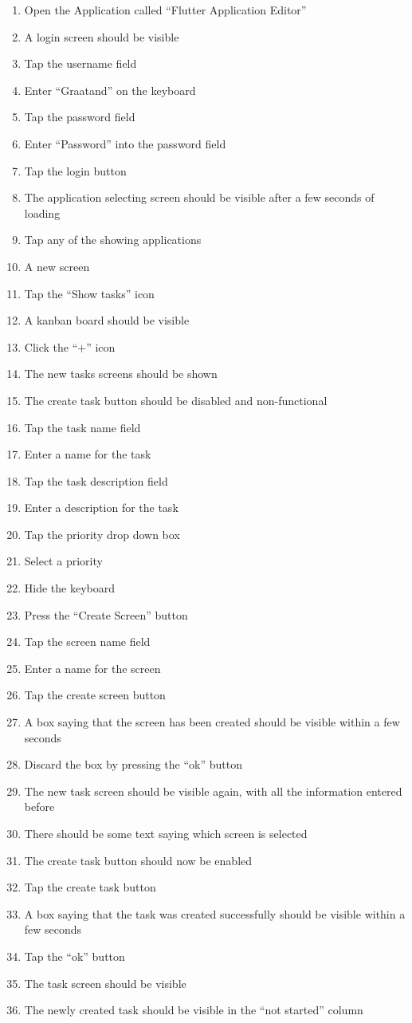 \begin{enumerate}
    \item Open the Application called “Flutter Application Editor”
    \item A login screen should be visible
    \item Tap the username field
    \item Enter “Graatand” on the keyboard
    \item Tap the password field
    \item Enter “Password” into the password field
    \item Tap the login button
    \item The application selecting screen should be visible after a few seconds of loading
    \item Tap any of the showing applications
    \item A new screen 
    \item Tap the “Show tasks” icon
    \item A kanban board should be visible
    \item Click the “+” icon
    \item The new tasks screens should be shown
    \item The create task button should be disabled and non-functional 
    \item Tap the task name field
    \item Enter a name for the task
    \item Tap the task description field
    \item Enter a description for the task
    \item Tap the priority drop down box
    \item Select a priority
    \item Hide the keyboard
    \item Press the “Create Screen” button
    \item Tap the screen name field
    \item Enter a name for the screen
    \item Tap the create screen button
    \item A box saying that the screen has been created should be visible within a few seconds
    \item Discard the box by pressing the “ok” button
    \item The new task screen should be visible again, with all the information entered before
    \item There should be some text saying which screen is selected
    \item The create task button should now be enabled
    \item Tap the create task button
    \item A box saying that the task was created successfully should be visible within a few seconds
    \item Tap the “ok” button
    \item The task screen should be visible
    \item The newly created task should be visible in the “not started” column
\end{enumerate}
